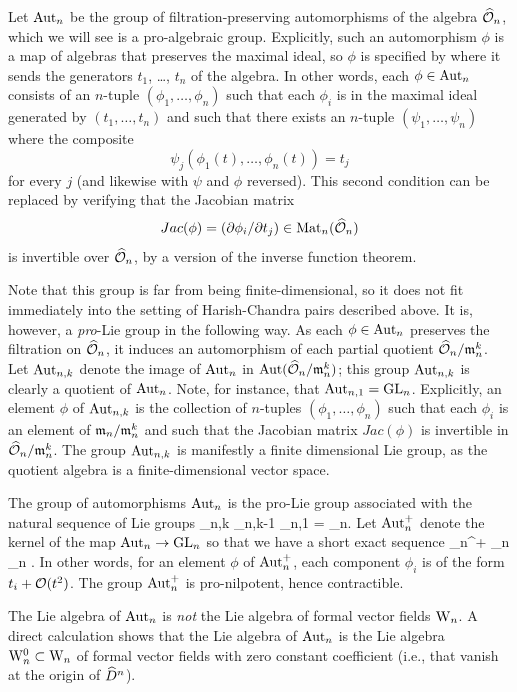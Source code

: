 \documentclass[10pt]{amsart}
\begin{document}
Let ${\rm Aut}_n$ be the group of filtration-preserving automorphisms of the algebra $\widehat{\mathcal O}_n$,
which we will see is a pro-algebraic group.
Explicitly, such an automorphism $\phi$ is a map of algebras that preserves the maximal ideal, 
so $\phi$ is specified by where it sends the generators $t_1$, \dots, $t_n$ of the algebra.
In other words, each $\phi \in {\rm Aut}_n$ consists of an $n$-tuple $(\phi_1,\ldots,\phi_n)$ 
such that each $\phi_i$ is in the maximal ideal generated by $(t_1,\ldots,t_n)$ and such that there exists an $n$-tuple $(\psi_1,\ldots,\psi_n)$ 
where the composite
\[
\psi_j(\phi_1(t),\ldots,\phi_n(t)) = t_j
\]
for every $j$ (and likewise with $\psi$ and $\phi$ reversed).
This second condition can be replaced by verifying that the Jacobian matrix
\[
Jac(\phi) = (\partial \phi_i/\partial t_j) \in {\rm Mat}_n(\widehat{\mathcal O}_n)
\]
is invertible over $\widehat{\mathcal O}_n$, by a version of the inverse function theorem.

Note that this group is far from being finite-dimensional, so it does not fit immediately into the setting of Harish-Chandra pairs described above. 
It is, however, a {\em pro}-Lie group in the following way. 
As each $\phi \in {\rm Aut}_n$ preserves the filtration on $\widehat{\mathcal O}_n$, it induces an automorphism of each partial quotient $\widehat{\mathcal O}_n/{\mathfrak m}_n^k$.
Let ${\rm Aut}_{n,k}$ denote the image of ${\rm Aut}_n$ in ${\rm Aut}(\widehat{\mathcal O}_n/{\mathfrak m}_n^k)$; this group ${\rm Aut}_{n,k}$ is clearly a quotient of ${\rm Aut}_n$.
Note, for instance, that ${\rm Aut}_{n,1} = {\rm GL}_n$.
Explicitly, an element $\phi$ of ${\rm Aut}_{n,k}$ is the collection of $n$-tuples $(\phi_1,\ldots,\phi_n)$ 
such that each $\phi_i$ is an element of ${\mathfrak m}_n/{\mathfrak m}_n^k$ and such that the Jacobian matrix $Jac(\phi)$ is invertible in $\widehat{\mathcal O}_n/{\mathfrak m}_n^k$.
The group ${\rm Aut}_{n,k}$ is manifestly a finite dimensional Lie group, as the quotient algebra is a finite-dimensional vector space. 
 
The group of automorphisms ${\rm Aut}_n$ is the pro-Lie group associated with the natural sequence of Lie groups
\ben
\cdots \to \Aut_{n,k} \to \Aut_{n,k-1} \to \cdots \to \Aut_{n,1} = \GL_n.
\een
Let ${\rm Aut}_n^+$ denote the kernel of the map ${\rm Aut}_n \to {\rm GL}_n$ so that we have a short exact sequence
 \to \Aut_n^+ \to \Aut_n \to \GL_n  .
\een
In other words, for an element $\phi$ of ${\rm Aut}_n^+$, each component
$\phi_i$ is of the form $t_i + \mathcal O(t^2)$. The group ${\rm Aut}_n^+$ is
pro-nilpotent, hence contractible. 

The Lie algebra of ${\rm Aut}_n$ is {\em not} the Lie algebra of formal
vector fields ${{\rm W}_n}$. A direct
calculation shows that the Lie algebra of ${\rm Aut}_n$ is the Lie algebra ${{\rm W}^0_n} \subset {{\rm W}_n}$ of formal vector fields with zero constant coefficient (i.e., that vanish at the origin of $\widehat{D}^n$). 
\end{document}
